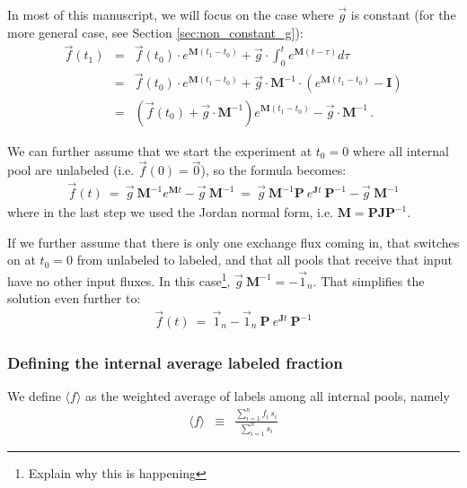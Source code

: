 \documentclass{article}
\newcommand{\fin}{\ensuremath{\langle f \rangle}}
\begin{document}
In most of this manuscript, we will focus on the case where $\vec{g}$ is constant (for the more general case, see Section \ref{sec:non_constant_g}):
\begin{eqnarray}
    \vec{f}(t_1) &=& 
    \vec{f}(t_0) \cdot e^{\mathbf{M} (t_1 - t_0)} + \vec{g} \cdot \int_0^t e^{\mathbf{M} (t-\tau)} d\tau \nonumber\\
    &=&
    \vec{f}(t_0) \cdot e^{\mathbf{M} (t_1 - t_0)} + \vec{g} \cdot \mathbf{M}^{-1} \cdot  \left( e^{\mathbf{M}(t_1 - t_0)} - \mathbf{I} \right) \nonumber\\
    &=&
    \left(\vec{f}(t_0) + \vec{g} \cdot \mathbf{M}^{-1} \right) e^{\mathbf{M}(t_1 - t_0)} - \vec{g} \cdot \mathbf{M}^{-1}
    \,.
\end{eqnarray}

We can further assume that we start the experiment at $t_0 = 0$ where all internal pool are unlabeled (i.e. $\vec{f}(0) = \vec{0}$), so the formula becomes:
\begin{eqnarray}
    \vec{f}(t) ~=~ 
    \vec{g} ~ \mathbf{M}^{-1} e^{\mathbf{M}t} - \vec{g} ~ \mathbf{M}^{-1}
    ~=~
    \vec{g} ~ \mathbf{M}^{-1} \mathbf{P} ~e^{\mathbf{J}t} ~\mathbf{P}^{-1} 
    - \vec{g} ~ \mathbf{M}^{-1}
\end{eqnarray}
where in the last step we used the Jordan normal form, i.e. $\mathbf{M} = \mathbf{P} \mathbf{J} \mathbf{P}^{-1}$.

If we further assume that there is only one exchange flux coming in, that switches on at $t_0 = 0$ from unlabeled to labeled, and that all pools that receive that input have no other input fluxes. In this case\footnote{Explain why this is happening}, $\vec{g}~\mathbf{M}^{-1} = -\vec{1}_n$. That simplifies the solution even further to:
\begin{eqnarray}
    \vec{f}(t) ~=~ \vec{1}_n - \vec{1}_n ~ \mathbf{P} ~ e^{\mathbf{J}t} ~ \mathbf{P}^{-1}
\end{eqnarray}

\subsubsection{Defining the internal average labeled fraction}

We define $\fin$ as the weighted average of labels among all internal pools, namely 
\begin{eqnarray}\label{eq:dfin_dt}
\fin &\equiv& \frac{\sum_{i=1}^{n} f_i \, s_i}{\sum_{i=1}^{n} s_i}
\end{eqnarray}
\end{document}
